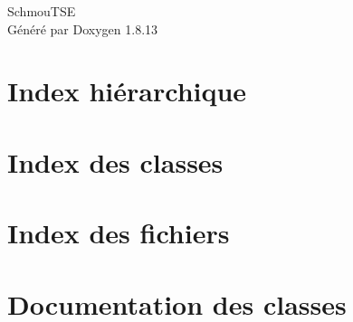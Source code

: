 \documentclass[twoside]{book}
\newcommand{\+}{\discretionary{\mbox{\scriptsize$\hookleftarrow$}}{}{}}
\newcommand{\clearemptydoublepage}{%
  \newpage{\pagestyle{empty}\cleardoublepage}%
}
\begin{document}
\hypersetup{pageanchor=false,
             bookmarksnumbered=true,
             pdfencoding=unicode
            }
\begin{titlepage}
\vspace*{7cm}
\begin{center}%
{\Large Schmou\textquotesingle{}T\+SE }\\
\vspace*{1cm}
{\large Généré par Doxygen 1.8.13}\\
\end{center}
\end{titlepage}
\clearemptydoublepage
{}
\tableofcontents
\clearemptydoublepage
{}
\hypersetup{pageanchor=true}

\chapter{Index hiérarchique}

\chapter{Index des classes}

\chapter{Index des fichiers}

\chapter{Documentation des classes}






















\end{document}
